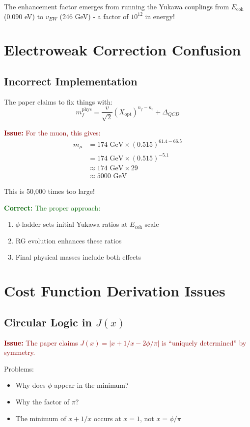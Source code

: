 \documentclass[12pt,a4paper]{article}
\newcommand{\issue}[1]{\textcolor{darkred}{\textbf{Issue: }#1}}
\newcommand{\correct}[1]{\textcolor{darkgreen}{\textbf{Correct: }#1}}
\begin{document}
The enhancement factor emerges from running the Yukawa couplings from $E_{\text{coh}}$ (0.090 eV) to $v_{EW}$ (246 GeV) - a factor of $10^{12}$ in energy!

\section{Electroweak Correction Confusion}

\subsection{Incorrect Implementation}

The paper claims to fix things with:
\begin{equation}
m_f^{\text{phys}} = \frac{v}{\sqrt{2}} (X_{\text{opt}})^{n_f - n_e} + \Delta_{QCD}
\end{equation}

\issue{For the muon, this gives:}
\begin{align}
m_\mu &= 174 \text{ GeV} \times (0.515)^{61.4 - 66.5}\\
&= 174 \text{ GeV} \times (0.515)^{-5.1}\\
&\approx 174 \text{ GeV} \times 29\\
&\approx 5000 \text{ GeV}
\end{align}

This is 50,000 times too large!

\correct{The proper approach:}
\begin{enumerate}
\item $\phi$-ladder sets initial Yukawa ratios at $E_{\text{coh}}$ scale
\item RG evolution enhances these ratios
\item Final physical masses include both effects
\end{enumerate}

\section{Cost Function Derivation Issues}

\subsection{Circular Logic in $J(x)$}

\issue{The paper claims $J(x) = |x + 1/x - 2\phi/\pi|$ is ``uniquely determined'' by symmetry.}

Problems:
\begin{itemize}
\item Why does $\phi$ appear in the minimum?
\item Why the factor of $\pi$?  
\item The minimum of $x + 1/x$ occurs at $x = 1$, not $x = \phi/\pi$
\end{itemize}
\end{document}
